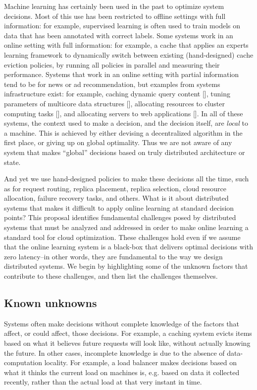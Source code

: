\documentclass[a4paper,twocolumn]{article}
\begin{document}
Machine learning has certainly been used in the past to optimize system decisions. Most
of this use has been restricted to offline settings with full information: for example,
supervised learning is often used to train models on data that has been annotated with
correct labels. Some systems work in an online setting with full information: for example,
a cache that applies an experts learning framework to dynamically switch between existing
(hand-designed) cache eviction policies, by running all policies in parallel and measuring
their performance. Systems that work in an online setting with partial information tend to
be for news or ad recommendation, but examples from systems infrastructure exist: for example,
caching dynamic query content [], tuning parameters of multicore data structures [], allocating
resources to cluster computing tasks [], and allocating servers to web applications [].
In all of these systems, the context used to make a decision, and the
decision itself, are {\em local} to a machine. This is achieved by either devising a decentralized
algorithm in the first place, or giving up on global optimality. Thus we are not aware of any
system that makes ``global'' decisions based on truly distributed architecture or state.

And yet we use hand-designed policies to make these decisions all the time, such as for request
routing, replica placement, replica selection, cloud resource allocation, failure recovery tasks, 
and others. What is it about distributed systems that makes it difficult to apply online learning
at standard decision points? This proposal identifies fundamental challenges posed by distributed
systems that must be analyzed and addressed in order to make online learning a standard tool for
cloud optimization.  These challenges hold even if we assume that the online learning system is
a black-box that delivers optimal decisions with zero latency--in other words,
they are fundamental to the way we design distributed systems.  We begin by highlighting some of the unknown factors
that contribute to these challenges, and then list the challenges themselves.

\subsection*{Known unknowns}

Systems often make decisions without complete knowledge of the factors that affect,
or could affect, those decisions.  For example, a caching system evicts items based
on what it believes future requests will look like, without actually knowing the future.
In other cases, incomplete knowledge is due to the absence of data-computation locality.
For example, a load balancer makes decisions based on what it thinks the current load on
machines is, e.g. based on data it collected recently, rather than the actual load at that
very instant in time.
\end{document}
